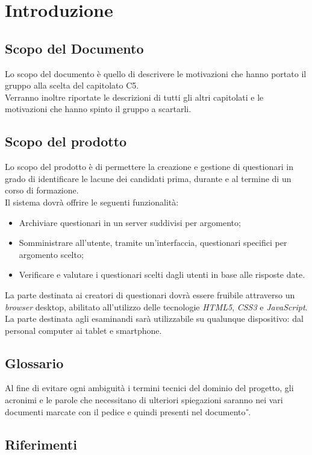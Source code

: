 \newpage
\section{Introduzione}

\subsection{Scopo del Documento}
Lo scopo del documento è quello di descrivere le motivazioni che hanno portato il gruppo alla scelta del capitolato C5. \\ Verranno inoltre riportate le descrizioni di tutti gli altri capitolati e le motivazioni che hanno spinto il gruppo a scartarli.
 
\subsection{Scopo del prodotto}
Lo scopo del prodotto è di permettere la creazione e gestione di questionari in grado di identificare le lacune dei candidati prima, durante e al termine di un corso di formazione. 
\\Il sistema dovrà offrire le seguenti funzionalità:
\begin{itemize}
	\item
	Archiviare questionari in un server suddivisi per argomento;
	\item
	Somministrare all'utente, tramite un'interfaccia, questionari specifici per argomento scelto;
	\item
	Verificare e valutare i questionari scelti dagli utenti in base alle risposte date.
\end{itemize}
La parte destinata ai creatori di questionari dovrà essere fruibile attraverso un \textit{browser} desktop, abilitato all'utilizzo delle tecnologie \textit{HTML5}, \textit{CSS3} e \textit{JavaScript}. La parte destinata agli esaminandi sarà utilizzabile su qualunque dispositivo: dal personal computer ai tablet e smartphone.

\subsection{Glossario}
Al fine di evitare ogni ambiguità i termini tecnici del dominio del progetto, gli acronimi e le parole che necessitano di ulteriori spiegazioni saranno nei vari documenti marcate con il pedice  e quindi presenti nel documento \textit{\G}.
\subsection{Riferimenti}

